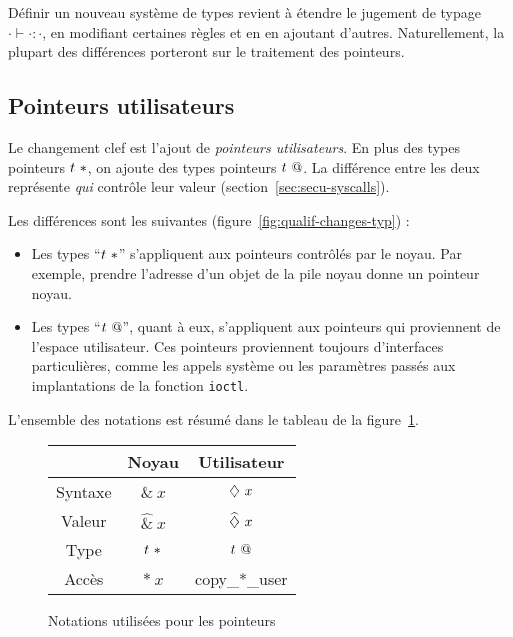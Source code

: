 Définir un nouveau système de types revient à étendre le jugement de typage
$\cdot ⊢ \cdot : \cdot$, en modifiant certaines règles et en en ajoutant
d'autres. Naturellement, la plupart des différences porteront sur le traitement
des pointeurs.

\subsection*{Pointeurs utilisateurs}

Le changement clef est l'ajout de \emph{pointeurs utilisateurs}. En plus des
types pointeurs $t~*$, on ajoute des types pointeurs $t~@$. La
différence entre les deux représente \emph{qui} contrôle leur valeur
(section~\ref{sec:secu-syscalls}).

Les différences sont les suivantes (figure~\ref{fig:qualif-changes-typ}) :

\begin{itemize}

\item Les types ``$t~*$'' s'appliquent aux pointeurs contrôlés par le
noyau. Par exemple, prendre l'adresse d'un objet de la pile noyau donne un
pointeur noyau.

\item Les types ``$t~@$'', quant à eux, s'appliquent aux pointeurs qui
proviennent de l'espace utilisateur. Ces pointeurs proviennent toujours
d'interfaces particulières, comme les appels système ou les paramètres passés
aux implantations de la fonction \texttt{ioctl}.

\end{itemize}

L'ensemble des notations est résumé dans le tableau de la
figure~\ref{fig:qualif-not-resume}.

\begin{figure}
\centering
\begin{tabular}{ccc}
        & Noyau      & Utilisateur \\
\hline
Syntaxe & $\&~x$     & $\diamondsuit~x$ \\
Valeur  & $\widehat{\&}~x$ & $\widehat{\diamondsuit}~x$ \\
Type    & $t~*$ & $t~@$ \\
Accès   & $*~x$      & copy\_*\_user \\
\end{tabular}

\caption{Notations utilisées pour les pointeurs}
\label{fig:qualif-not-resume}
\end{figure}

